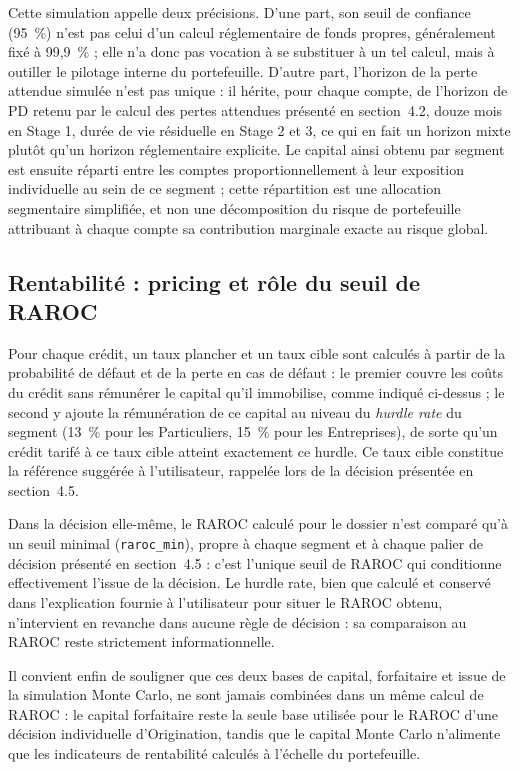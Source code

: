 Cette simulation appelle deux précisions. D'une part, son seuil de confiance (95~\%) n'est pas celui d'un calcul réglementaire de fonds propres, généralement fixé à 99,9~\% ; elle n'a donc pas vocation à se substituer à un tel calcul, mais à outiller le pilotage interne du portefeuille. D'autre part, l'horizon de la perte attendue simulée n'est pas unique : il hérite, pour chaque compte, de l'horizon de PD retenu par le calcul des pertes attendues présenté en section~4.2, douze mois en Stage 1, durée de vie résiduelle en Stage 2 et 3, ce qui en fait un horizon mixte plutôt qu'un horizon réglementaire explicite. Le capital ainsi obtenu par segment est ensuite réparti entre les comptes proportionnellement à leur exposition individuelle au sein de ce segment ; cette répartition est une allocation segmentaire simplifiée, et non une décomposition du risque de portefeuille attribuant à chaque compte sa contribution marginale exacte au risque global.

\subsection{Rentabilité : pricing et rôle du seuil de RAROC}

Pour chaque crédit, un taux plancher et un taux cible sont calculés à partir de la probabilité de défaut et de la perte en cas de défaut : le premier couvre les coûts du crédit sans rémunérer le capital qu'il immobilise, comme indiqué ci-dessus ; le second y ajoute la rémunération de ce capital au niveau du \emph{hurdle rate} du segment (13~\% pour les Particuliers, 15~\% pour les Entreprises), de sorte qu'un crédit tarifé à ce taux cible atteint exactement ce hurdle. Ce taux cible constitue la référence suggérée à l'utilisateur, rappelée lors de la décision présentée en section~4.5.

Dans la décision elle-même, le RAROC calculé pour le dossier n'est comparé qu'à un seuil minimal (\texttt{raroc\_min}), propre à chaque segment et à chaque palier de décision présenté en section~4.5 : c'est l'unique seuil de RAROC qui conditionne effectivement l'issue de la décision. Le hurdle rate, bien que calculé et conservé dans l'explication fournie à l'utilisateur pour situer le RAROC obtenu, n'intervient en revanche dans aucune règle de décision : sa comparaison au RAROC reste strictement informationnelle.

Il convient enfin de souligner que ces deux bases de capital, forfaitaire et issue de la simulation Monte Carlo, ne sont jamais combinées dans un même calcul de RAROC : le capital forfaitaire reste la seule base utilisée pour le RAROC d'une décision individuelle d'Origination, tandis que le capital Monte Carlo n'alimente que les indicateurs de rentabilité calculés à l'échelle du portefeuille.

